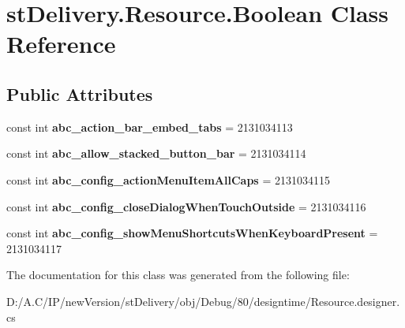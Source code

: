 \hypertarget{classst_delivery_1_1_resource_1_1_boolean}{}\section{st\+Delivery.\+Resource.\+Boolean Class Reference}
\label{classst_delivery_1_1_resource_1_1_boolean}
\subsection*{Public Attributes}
\begin{DoxyCompactItemize}
\item 
\mbox{\label{classst_delivery_1_1_resource_1_1_boolean_acd376a62985a73110f08f2e8d95f59a3}} 
const int {\bfseries abc\+\_\+action\+\_\+bar\+\_\+embed\+\_\+tabs} = 2131034113
\item 
\mbox{\label{classst_delivery_1_1_resource_1_1_boolean_a233408bdb266576413f89d8d28a0de91}} 
const int {\bfseries abc\+\_\+allow\+\_\+stacked\+\_\+button\+\_\+bar} = 2131034114
\item 
\mbox{\label{classst_delivery_1_1_resource_1_1_boolean_a7adc3e0c452989e3452c6ee0686c3f1e}} 
const int {\bfseries abc\+\_\+config\+\_\+action\+Menu\+Item\+All\+Caps} = 2131034115
\item 
\mbox{\label{classst_delivery_1_1_resource_1_1_boolean_a4bac88b77b8e1249c90b6dfdae619a53}} 
const int {\bfseries abc\+\_\+config\+\_\+close\+Dialog\+When\+Touch\+Outside} = 2131034116
\item 
\mbox{\label{classst_delivery_1_1_resource_1_1_boolean_ab6b7088ae2f56d65576fc018ae28749c}} 
const int {\bfseries abc\+\_\+config\+\_\+show\+Menu\+Shortcuts\+When\+Keyboard\+Present} = 2131034117
\end{DoxyCompactItemize}


The documentation for this class was generated from the following file\+:\begin{DoxyCompactItemize}
\item 
D\+:/\+A.\+C/\+I\+P/new\+Version/st\+Delivery/obj/\+Debug/80/designtime/Resource.\+designer.\+cs\end{DoxyCompactItemize}
